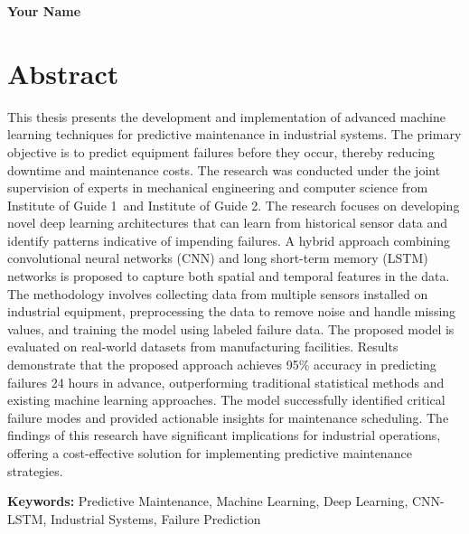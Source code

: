 \documentclass[12pt,a4paper]{report}
\newcommand{\authorname}{Your Name}
\newcommand{\guideIinst}{Institute of Guide 1}
\newcommand{\guideIIinst}{Institute of Guide 2}
\begin{document}
\begin{flushright}
\textbf{\authorname}
\end{flushright}

\cleardoublepage
\chapter*{Abstract}

This thesis presents the development and implementation of advanced machine learning techniques for predictive maintenance in industrial systems.
The primary objective is to predict equipment failures before they occur, thereby reducing downtime and maintenance costs.
The research was conducted under the joint supervision of experts in mechanical engineering and computer science from \guideIinst\ and \guideIIinst.
The research focuses on developing novel deep learning architectures that can learn from historical sensor data and identify patterns indicative of impending failures.
A hybrid approach combining convolutional neural networks (CNN) and long short-term memory (LSTM) networks is proposed to capture both spatial and temporal features in the data.
The methodology involves collecting data from multiple sensors installed on industrial equipment, preprocessing the data to remove noise and handle missing values, and training the model using labeled failure data.
The proposed model is evaluated on real-world datasets from manufacturing facilities.
Results demonstrate that the proposed approach achieves 95\% accuracy in predicting failures 24 hours in advance, outperforming traditional statistical methods and existing machine learning approaches.
The model successfully identified critical failure modes and provided actionable insights for maintenance scheduling.
The findings of this research have significant implications for industrial operations, offering a cost-effective solution for implementing predictive maintenance strategies.

\textbf{Keywords:} Predictive Maintenance, Machine Learning, Deep Learning, CNN-LSTM, Industrial Systems, Failure Prediction

\cleardoublepage
\tableofcontents
\cleardoublepage

\cleardoublepage
\listoffigures
{}
\cleardoublepage

\cleardoublepage
\listoftables
{}
\cleardoublepage
\end{document}
